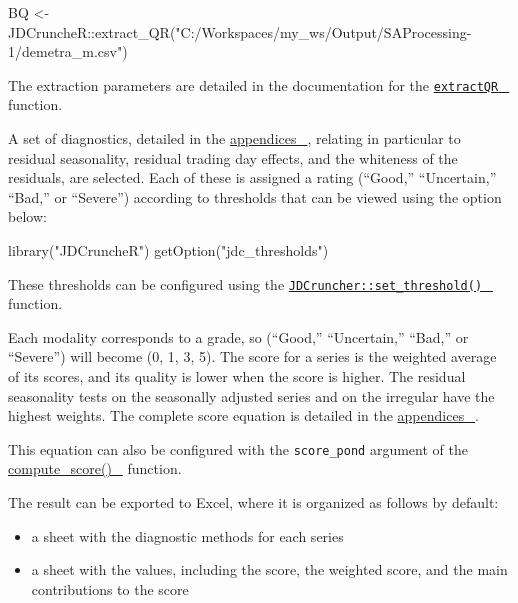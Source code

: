 \documentclass[
  letterpaper,
  DIV=11,
  numbers=noendperiod]{scrreprt}
\newenvironment{Shaded}{\begin{snugshade}}{\end{snugshade}}
\newcommand{\FunctionTok}[1]{\textcolor[rgb]{0.28,0.35,0.67}{#1}}
\newcommand{\NormalTok}[1]{\textcolor[rgb]{0.00,0.23,0.31}{#1}}
\newcommand{\OtherTok}[1]{\textcolor[rgb]{0.00,0.23,0.31}{#1}}
\newcommand{\SpecialCharTok}[1]{\textcolor[rgb]{0.37,0.37,0.37}{#1}}
\newcommand{\StringTok}[1]{\textcolor[rgb]{0.13,0.47,0.30}{#1}}
\begin{document}
\begin{Shaded}
\begin{Highlighting}[]
\NormalTok{BQ }\OtherTok{\textless{}{-}}\NormalTok{ JDCruncheR}\SpecialCharTok{::}\FunctionTok{extract\_QR}\NormalTok{(}\StringTok{"C:/Workspaces/my\_ws/Output/SAProcessing{-}1/demetra\_m.csv"}\NormalTok{)}
\end{Highlighting}
\end{Shaded}

The extraction parameters are detailed in the documentation for the
\href{https://inseefr.github.io/JDCruncheR/reference/extract_QR.html}{\texttt{extractQR}~🔗}
function.

A set of diagnostics, detailed in the
\protect\hyperlink{ind-bq-r}{appendices~🔗}, relating in particular to
residual seasonality, residual trading day effects, and the whiteness of
the residuals, are selected. Each of these is assigned a rating
(``Good,'' ``Uncertain,'' ``Bad,'' or ``Severe'') according to
thresholds that can be viewed using the option below:

\begin{Shaded}
\begin{Highlighting}[]
\FunctionTok{library}\NormalTok{(}\StringTok{"JDCruncheR"}\NormalTok{)}
\FunctionTok{getOption}\NormalTok{(}\StringTok{"jdc\_thresholds"}\NormalTok{)}
\end{Highlighting}
\end{Shaded}

These thresholds can be configured using the
\href{https://inseefr.github.io/JDCruncheR/reference/set_thresholds.html}{\texttt{JDCruncher::set\_threshold()}~🔗}
function.

Each modality corresponds to a grade, so (``Good,'' ``Uncertain,''
``Bad,'' or ``Severe'') will become (0, 1, 3, 5). The score for a series
is the weighted average of its scores, and its quality is lower when the
score is higher. The residual seasonality tests on the seasonally
adjusted series and on the irregular have the highest weights. The
complete score equation is detailed in the
\protect\hyperlink{eq-score}{appendices~🔗}.

This equation can also be configured with the \texttt{score\_pond}
argument of the
\href{https://inseefr.github.io/JDCruncheR/reference/compute_score.html}{compute\_score()~🔗}
function.

The result can be exported to Excel, where it is organized as follows by
default:

\begin{itemize}
\item
  a sheet with the diagnostic methods for each series
\item
  a sheet with the values, including the score, the weighted score, and
  the main contributions to the score
\end{itemize}
\end{document}

